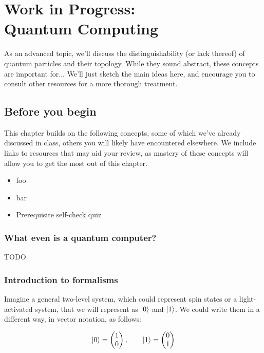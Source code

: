 \documentclass[12pt, english]{book}
\begin{document}
\chapter[Quantum computing]{Work in Progress:\\Quantum Computing} \label{ch:computing}
As an advanced topic, we'll discuss the distinguishability (or lack thereof) of quantum particles and their topology.
While they sound abstract, these concepts are important for...
We'll just sketch the main ideas here, and encourage you to consult other resources for a more thorough treatment.



\section{Before you begin}

This chapter builds on the following concepts, some of which we've already discussed in class, others you will likely have encountered elsewhere.
We include links to resources that may aid your review, as mastery of these concepts will allow you to get the most out of this chapter.

\begin{itemize}
	\item foo 
	\item bar 
	\item Prerequisite self-check quiz 
\end{itemize}



\subsection{What even is a quantum computer?}

TODO 


\subsection{Introduction to formalisms}

Imagine a general two-level system, which could represent spin states or a light-activated system, that we will represent as $\ket{0}$ and $\ket{1}$.
We could write them in a different way, in vector notation, as follows:

\begin{equation*}
	\ket{0} = \begin{pmatrix} 1 \\ 0 \end{pmatrix}, \qquad \ket{1} = \begin{pmatrix} 0 \\ 1 \end{pmatrix} 
\end{equation*}
\end{document}
